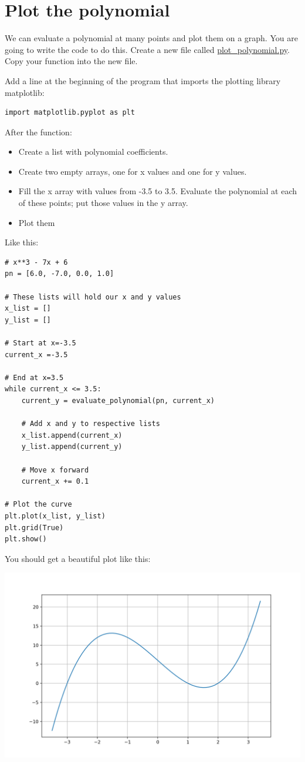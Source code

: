 \section{Plot the polynomial}

We can evaluate a polynomial at many points and plot them on a
graph. You are going to write the code to do this.  Create a new file
called \url{plot_polynomial.py}. Copy your 
function into the new file.

Add a line at the beginning of the program that imports the plotting library matplotlib:
\begin{Verbatim}
import matplotlib.pyplot as plt
\end{Verbatim}

After the  function:
\begin{itemize}
\item Create a list with polynomial coefficients.
\item Create two empty arrays, one for x values and one for y values.
\item Fill the x array with values from -3.5 to 3.5. Evaluate the polynomial at each of these points; put those values
  in the y array.
\item Plot them
\end{itemize}

Like this:
\begin{Verbatim}
# x**3 - 7x + 6
pn = [6.0, -7.0, 0.0, 1.0]

# These lists will hold our x and y values
x_list = []
y_list = []

# Start at x=-3.5
current_x =-3.5

# End at x=3.5
while current_x <= 3.5:
    current_y = evaluate_polynomial(pn, current_x)

    # Add x and y to respective lists
    x_list.append(current_x)
    y_list.append(current_y)

    # Move x forward
    current_x += 0.1

# Plot the curve
plt.plot(x_list, y_list)
plt.grid(True)
plt.show()
\end{Verbatim}

You should get a beautiful plot like this:

\includegraphics[width=\textwidth]{polyplot1.png}
